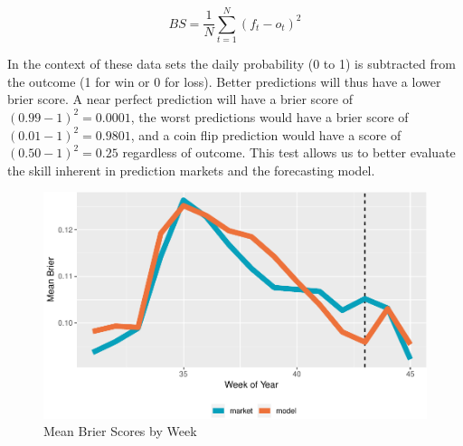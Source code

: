 \documentclass[11pt,]{article}
\begin{document}
\[
BS={\frac {1}{N}}\sum \limits _{t=1}^{N}(f_{t}-o_{t})^{2}
\]

In the context of these data sets the daily probability (0 to 1) is
subtracted from the outcome (1 for win or 0 for loss). Better
predictions will thus have a lower brier score. A near perfect
prediction will have a brier score of \((0.99-1)^2 = 0.0001\), the worst
predictions would have a brier score of \((0.01-1)^2 = 0.9801\), and a
coin flip prediction would have a score of \((0.50 - 1)^2 = 0.25\)
regardless of outcome. This test allows us to better evaluate the skill
inherent in prediction markets and the forecasting model.

\begin{figure}
\centering
\includegraphics{paper_files/figure-latex/plot_brier_week-1.pdf}
\caption{Mean Brier Scores by Week}
\end{figure}
\end{document}
